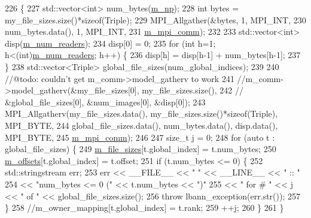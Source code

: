 \begin{DoxyCode}
226                                                                                                    \{
227   std::vector<int> num\_bytes(\hyperlink{classlbann_1_1generic__data__store_afcd4f99959c265c8c03dcf8ad3779d85}{m\_np});
228   \textcolor{keywordtype}{int} bytes = my\_file\_sizes.size()*\textcolor{keyword}{sizeof}(Triple);
229   MPI\_Allgather(&bytes, 1, MPI\_INT,
230                  num\_bytes.data(), 1, MPI\_INT,
231                  \hyperlink{classlbann_1_1generic__data__store_ae2d2d61d5d766a7f525eedcb05e0dbf6}{m\_mpi\_comm});
232 
233   std::vector<int> disp(\hyperlink{classlbann_1_1generic__data__store_a4381c1192e029d24c5b02cbd68988f77}{m\_num\_readers}); 
234   disp[0] = 0;
235   \textcolor{keywordflow}{for} (\textcolor{keywordtype}{int} h=1; h<(int)\hyperlink{classlbann_1_1generic__data__store_a4381c1192e029d24c5b02cbd68988f77}{m\_num\_readers}; h++) \{
236     disp[h] = disp[h-1] + num\_bytes[h-1];
237   \}
238   std::vector<Triple> global\_file\_sizes(num\_global\_indices);
239 
240   \textcolor{comment}{//@todo: couldn't get m\_comm->model\_gatherv to work}
241   \textcolor{comment}{//m\_comm->model\_gatherv(&my\_file\_sizes[0], my\_file\_sizes.size(), }
242    \textcolor{comment}{//                     &global\_file\_sizes[0], &num\_images[0], &disp[0]);}
243   MPI\_Allgatherv(my\_file\_sizes.data(), my\_file\_sizes.size()*\textcolor{keyword}{sizeof}(Triple), MPI\_BYTE,
244                  global\_file\_sizes.data(), num\_bytes.data(), disp.data(), MPI\_BYTE,
245                  \hyperlink{classlbann_1_1generic__data__store_ae2d2d61d5d766a7f525eedcb05e0dbf6}{m\_mpi\_comm});
246 
247   \textcolor{keywordtype}{size\_t} j = 0;
248   \textcolor{keywordflow}{for} (\textcolor{keyword}{auto} t : global\_file\_sizes) \{
249     \hyperlink{classlbann_1_1data__store__image_a1903176a4b305fd42617ea1cb6d997ae}{m\_file\_sizes}[t.global\_index] = t.num\_bytes;
250     \hyperlink{classlbann_1_1data__store__image_ae5a9ba5fb1bf4d3147743012b8099038}{m\_offsets}[t.global\_index] = t.offset;
251     \textcolor{keywordflow}{if} (t.num\_bytes <= 0) \{
252       std::stringstream err;
253       err << \_\_FILE\_\_ << \textcolor{stringliteral}{" "} << \_\_LINE\_\_ << \textcolor{stringliteral}{" :: "} 
254         << \textcolor{stringliteral}{"num\_bytes  <= 0 ("} << t.num\_bytes << \textcolor{stringliteral}{")"}
255         << \textcolor{stringliteral}{" for # "} << j << \textcolor{stringliteral}{" of "} << global\_file\_sizes.size();
256       \textcolor{keywordflow}{throw} lbann\_exception(err.str());
257     \}
258     \textcolor{comment}{//m\_owner\_mapping[t.global\_index] = t.rank;}
259     ++j;
260   \}
261 \}
\end{DoxyCode}

